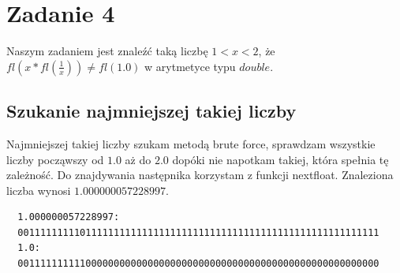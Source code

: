 \documentclass{article}
\begin{document}
\section*{Zadanie 4}
Naszym zadaniem jest znaleźć taką liczbę $1 < x < 2$, że $fl(x*fl(\frac{1}{x})) \neq fl(1.0)$ w arytmetyce typu
$double$.
\subsection*{Szukanie najmniejszej takiej liczby}
Najmniejszej takiej liczby szukam metodą brute force, sprawdzam wszystkie
liczby począwszy od $1.0$ aż do $2.0$ dopóki nie napotkam takiej, która spełnia tę
zależność. Do znajdywania następnika korzystam z funkcji nextfloat.
Znaleziona liczba wynosi $1.000000057228997$.
\begin{Verbatim}
  1.000000057228997:
  0011111111101111111111111111111111111111111111111111111111111111
  1.0:
  0011111111110000000000000000000000000000000000000000000000000000
\end{Verbatim}
\end{document}
